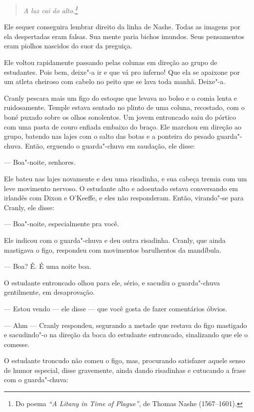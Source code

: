 \begin{verse}\itshape
A luz cai do alto.\footnote{ Do poema \textit{“A Litany in Time
of Plague”}, de Thomas Nashe (1567--1601).}
\end{verse}

Ele sequer conseguira lembrar direito da linha de Nashe. Todas as
imagens por ela despertadas eram falsas. Sua mente paria bichos
imundos. Seus pensamentos eram piolhos nascidos do suor da preguiça.

Ele voltou rapidamente passando pelas colunas em direção ao grupo de
estudantes. Pois bem, deixe"-a ir e que vá pro inferno! Que ela se
apaixone por um atleta cheiroso com cabelo no peito que se lava toda
manhã. Deixe"-a.

Cranly pescara mais um figo do estoque que levava no bolso e o comia
lenta e ruidosamente. Temple estava sentado no plinto
de uma coluna, recostado, com o boné puxado sobre os olhos sonolentos.
Um jovem entroncado saiu do pórtico com uma pasta de couro enfiada
embaixo do braço. Ele marchou em direção ao grupo, batendo nas lajes
com o salto das botas e a ponteira do pesado guarda"-chuva. Então,
erguendo o guarda"-chuva em saudação, ele disse:

 --- Boa"-noite, senhores.

Ele bateu nas lajes novamente e deu uma risadinha, e sua cabeça tremia
com um leve movimento nervoso. O estudante alto e adoentado estava
conversando em irlandês com Dixon e O’Keeffe, e eles não responderam.
Então, virando"-se para Cranly, ele disse:

 --- Boa"-noite, especialmente pra você.

Ele indicou com o guarda"-chuva e deu outra risadinha. Cranly, que ainda
mastigava o figo, respondeu com movimentos barulhentos da mandíbula.

 --- Boa? É. É uma noite boa.

O estudante entroncado olhou para ele, sério, e sacudiu o guarda"-chuva
gentilmente, em desaprovação.

 --- Estou vendo --- ele disse --- que você gosta de fazer comentários óbvios.

 --- Ahm --- Cranly respondeu, segurando a metade que restava do figo
mastigado e sacudindo"-o na direção da boca do estudante entroncado,
sinalizando que ele o comesse.

O estudante troncudo não comeu o figo, mas, procurando satisfazer aquele
senso de humor especial, disse gravemente, ainda dando risadinhas e
cutucando a frase com o guarda"-chuva:

